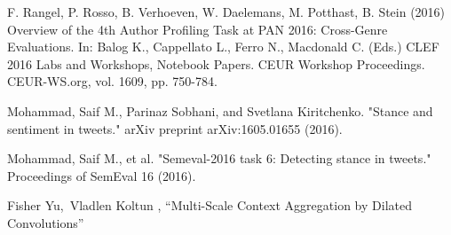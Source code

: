 \begin{thebibliography}{1}
F. Rangel, P. Rosso, B. Verhoeven, W. Daelemans, M. Potthast, B. Stein (2016) Overview of the 4th Author Profiling Task at PAN 2016: Cross-Genre Evaluations. In: Balog K., Cappellato L., Ferro N., Macdonald C. (Eds.) CLEF 2016 Labs and Workshops, Notebook Papers. CEUR Workshop Proceedings. CEUR-WS.org, vol. 1609, pp. 750-784.

Mohammad, Saif M., Parinaz Sobhani, and Svetlana Kiritchenko. "Stance and sentiment in tweets." arXiv preprint arXiv:1605.01655 (2016).

Mohammad, Saif M., et al. "Semeval-2016 task 6: Detecting stance in tweets." Proceedings of SemEval 16 (2016).

Fisher Yu, Vladlen Koltun , “Multi-Scale Context Aggregation by Dilated Convolutions”


\end{thebibliography}